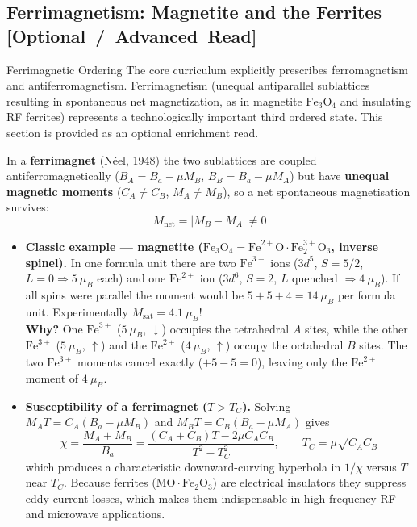 \documentclass[11pt,a4paper]{article}
\newcommand{\extratag}{\hfill\mbox{\normalfont\footnotesize\sffamily\color{secondary}\textbf{[Optional / Advanced Read]}}}
\begin{document}
\subsection[Ferrimagnetism: Magnetite and Ferrites (Optional Read)]{Ferrimagnetism: Magnetite and the Ferrites \extratag}
\label{sec:ferrimag}

\begin{enrichmentnote}{Ferrimagnetic Ordering}
The core curriculum explicitly prescribes ferromagnetism and antiferromagnetism. Ferrimagnetism (unequal antiparallel sublattices resulting in spontaneous net magnetization, as in magnetite $\text{Fe}_3\text{O}_4$ and insulating RF ferrites) represents a technologically important third ordered state. This section is provided as an optional enrichment read.
\end{enrichmentnote}

In a \textbf{ferrimagnet} (N\'eel, 1948) the two sublattices are coupled antiferromagnetically ($B_A = B_a - \mu M_B$, $B_B = B_a - \mu M_A$) but have \textbf{unequal magnetic moments} ($C_A \neq C_B$, $M_A\neq M_B$), so a net spontaneous magnetisation survives:
\begin{equation}
    M_{\mathrm{net}} = |M_B - M_A| \neq 0
    \label{eq:ferrinet}
\end{equation}

\begin{itemize}[leftmargin=1.6cm]
    \item \textbf{Classic example --- magnetite ($\text{Fe}_3\text{O}_4 = \text{Fe}^{2+}\text{O}\cdot\text{Fe}_2^{3+}\text{O}_3$, inverse spinel).}
    In one formula unit there are two $\text{Fe}^{3+}$ ions ($3d^5$, $S=5/2$, $L=0\Rightarrow5\ \mu_B$ each) and one $\text{Fe}^{2+}$ ion ($3d^6$, $S=2$, $L$ quenched $\Rightarrow4\ \mu_B$).
    If all spins were parallel the moment would be $5+5+4 = 14\ \mu_B$ per formula unit. Experimentally $M_{\mathrm{sat}} = 4.1\ \mu_B$!\\
    \textbf{Why?} One $\text{Fe}^{3+}$ ($5\ \mu_B$, $\downarrow$) occupies the tetrahedral $A$ sites, while the other $\text{Fe}^{3+}$ ($5\ \mu_B$, $\uparrow$) and the $\text{Fe}^{2+}$ ($4\ \mu_B$, $\uparrow$) occupy the octahedral $B$ sites. The two $\text{Fe}^{3+}$ moments cancel exactly ($+5-5=0$), leaving only the $\text{Fe}^{2+}$ moment of $4\ \mu_B$.
    \item \textbf{Susceptibility of a ferrimagnet ($T>T_C$).}
    Solving $M_AT = C_A(B_a-\mu M_B)$ and $M_BT = C_B(B_a-\mu M_A)$ gives
    \begin{equation}
        \boxed{\;\chi = \frac{M_A+M_B}{B_a}
        = \frac{(C_A+C_B)T - 2\mu C_AC_B}{T^2 - T_C^2},
        \qquad T_C = \mu\sqrt{C_AC_B}\;}
        \label{eq:ferrichi}
    \end{equation}
    which produces a characteristic downward-curving hyperbola in $1/\chi$ versus $T$ near $T_C$. Because ferrites ($\text{MO}\cdot\text{Fe}_2\text{O}_3$) are electrical insulators they suppress eddy-current losses, which makes them indispensable in high-frequency RF and microwave applications.
\end{itemize}
\end{document}
